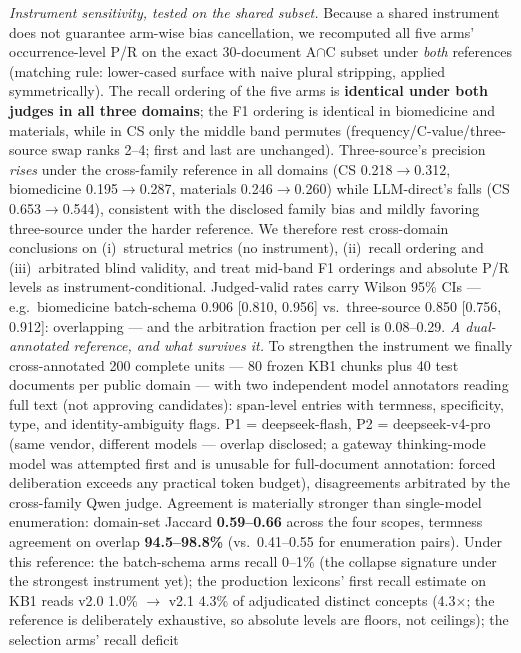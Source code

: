\documentclass[sigconf,nonacm,anonymous]{acmart}
\begin{document}
\emph{Instrument sensitivity, tested on the shared subset.} Because a
shared instrument does not guarantee arm-wise bias cancellation, we
recomputed all five arms' occurrence-level P/R on the exact 30-document
A$\cap$C subset under \emph{both} references (matching rule:
lower-cased surface with naive plural stripping, applied symmetrically).
The recall ordering of the five arms is \textbf{identical under both
judges in all three domains}; the F1 ordering is identical in
biomedicine and materials, while in CS only the middle band permutes
(frequency/C-value/three-source swap ranks 2--4; first and last are
unchanged). Three-source's precision \emph{rises} under the
cross-family reference in all domains (CS 0.218$\to$0.312, biomedicine
0.195$\to$0.287, materials 0.246$\to$0.260) while LLM-direct's falls
(CS 0.653$\to$0.544), consistent with the disclosed family bias and
mildly favoring three-source under the harder reference. We therefore
rest cross-domain conclusions on (i)~structural metrics (no
instrument), (ii)~recall ordering and (iii)~arbitrated blind validity,
and treat mid-band F1 orderings and absolute P/R levels as
instrument-conditional. Judged-valid rates carry Wilson 95\% CIs ---
e.g.\ biomedicine batch-schema 0.906 [0.810, 0.956] vs.\ three-source
0.850 [0.756, 0.912]: overlapping --- and the arbitration fraction per
cell is 0.08--0.29.
\emph{A dual-annotated reference, and what survives it.} To strengthen
the instrument we finally cross-annotated 200 complete units --- 80
frozen KB1 chunks plus 40 test documents per public domain --- with
two independent model annotators reading full text (not approving
candidates): span-level entries with termness, specificity, type, and
identity-ambiguity flags. P1 = deepseek-flash, P2 = deepseek-v4-pro
(same vendor, different models --- overlap disclosed; a gateway
thinking-mode model was attempted first and is unusable for
full-document annotation: forced deliberation exceeds any practical
token budget), disagreements arbitrated by the cross-family Qwen
judge. Agreement is materially stronger than single-model enumeration:
domain-set Jaccard \textbf{0.59--0.66} across the four scopes,
termness agreement on overlap \textbf{94.5--98.8\%} (vs.\ 0.41--0.55
for enumeration pairs). Under this reference: the batch-schema arms
recall 0--1\% (the collapse signature under the strongest instrument
yet); the production lexicons' first recall estimate on KB1 reads
v2.0 1.0\% $\to$ v2.1 4.3\% of adjudicated distinct concepts
(4.3$\times$; the reference is deliberately exhaustive, so absolute
levels are floors, not ceilings); the selection arms' recall deficit
\end{document}
